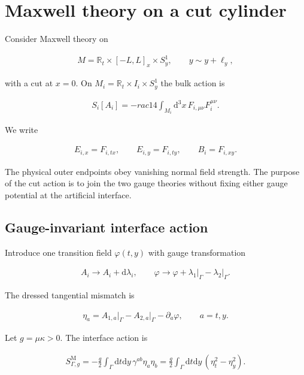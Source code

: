 \section{Maxwell theory on a cut cylinder}\label{sec:maxwell}

Consider Maxwell theory on

\begin{align}
M=\mathbb R_t\times[-L,L]_x\times S_y^1,
\qquad
y\sim y+\ell_y,
\end{align}

with a cut at $x=0$. On $M_i=\mathbb R_t\times I_i\times S_y^1$ the bulk action is

\begin{align}
S_i[A_i]=-
rac14\int_{M_i}\mathrm d^3x\,
F_{i,\mu\nu}F_i^{\mu\nu}.
\end{align}

We write

\begin{align}
E_{i,x}=F_{i,tx},
\qquad
E_{i,y}=F_{i,ty},
\qquad
B_i=F_{i,xy}.
\end{align}

The physical outer endpoints obey vanishing normal field strength. The purpose of the cut action is to join the two gauge theories without fixing either gauge potential at the artificial interface.

\subsection{Gauge-invariant interface action}\label{subsec:maxwell-interface}

Introduce one transition field $\varphi(t,y)$ with gauge transformation

\begin{align}
A_i\longrightarrow A_i+\mathrm d\lambda_i,
\qquad
\varphi\longrightarrow
\varphi+\lambda_1\big|_\Gamma-\lambda_2\big|_\Gamma.
\end{align}

The dressed tangential mismatch is

\begin{align}
\eta_a
=A_{1,a}\big|_\Gamma-A_{2,a}\big|_\Gamma-\partial_a\varphi,
\qquad
a=t,y.
\end{align}

Let $g=\mu\kappa>0$. The interface action is

\begin{align}
S_{\Gamma,g}^{\mathrm M}
=-\frac g2\int_\Gamma\mathrm dt\mathrm dy\,
\gamma^{ab}\eta_a\eta_b
=\frac g2\int_\Gamma\mathrm dt\mathrm dy\,
(\eta_t^2-\eta_y^2).
\end{align}

